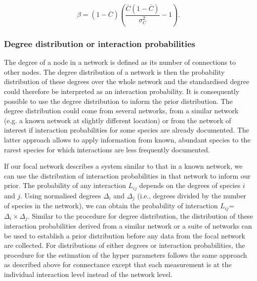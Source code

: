 \documentclass[12pt]{article}
\begin{document}
\begin{spacing}{2.0}
          \begin{equation}
          \beta = (1-\overline{C})(\frac{\overline{C}(1-\overline{C})}{\sigma_C^2}-1) .
          \end{equation}
    


      \subsubsection*{Degree distribution or interaction probabilities}

          The degree of a node in a network is defined as its number of connections to other nodes. The degree distribution of a network is then the probability distribution of these degrees over the whole network and the standardised degree could therefore be interpreted as an interaction probability. It is consequently possible to use the degree distribution to inform the prior distribution. The degree distribution could come from several networks, from a similar network (e.g. a known network at slightly different location) or from the network of interest if interaction probabilities for some species are already documented. The latter approach allows to apply information from known, abundant species to the rarest species for which interactions are less frequently documented. 


          If our focal network describes a system similar to that in a known network, we can use the distribution of interaction probabilities in that network to inform our prior. The probability of any interaction $L_{ij}$ depends on the degrees of species $i$ and $j$. Using normalised degrees $\Delta_i$ and $\Delta_j$ (i.e., degrees divided by the number of species in the network), we can obtain the probability of interaction $L_{ij}$=$\Delta_i\times\Delta_j$. Similar to the procedure for degree distribution, the distribution of these interaction probabilities derived from a similar network or a suite of networks can be used to establish a prior distribution before any data from the focal network are collected. For distributions of either degrees or interaction probabilities, the procedure for the estimation of the hyper parameters follows the same approach as described above for connectance except that each measurement is at the individual interaction level instead of the network level.



\end{spacing}
\end{document}
